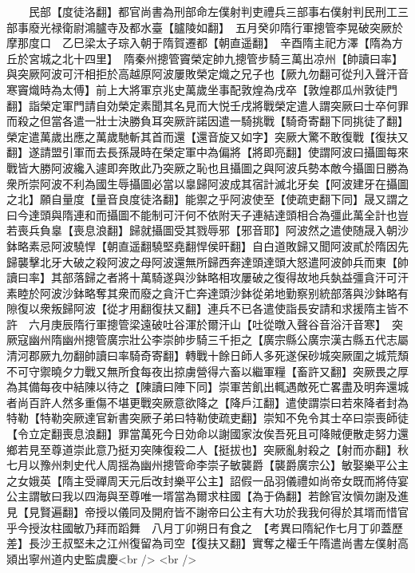 　　民部【度徒洛翻】都官尚書為刑部命左僕射判吏禮兵三部事右僕射判民刑工三部事廢光禄衛尉鴻臚寺及都水臺【臚陵如翻】　五月癸卯隋行軍摠管李晃破突厥於摩那度口　乙巳梁太子琮入朝于隋賀遷都【朝直遥翻】　辛酉隋主祀方澤【隋為方丘於宮城之北十四里】　隋秦州摠管竇榮定帥九摠管步騎三萬出凉州【帥讀曰率】與突厥阿波可汗相拒於高越原阿波屢敗榮定熾之兄子也【厥九勿翻可從刋入聲汗音寒竇熾時為太傅】前上大將軍京兆史萬歲坐事配敦煌為戌卒【敦煌郡瓜州敦徒門翻】詣榮定軍門請自効榮定素聞其名見而大悦壬戌將戰榮定遣人謂突厥曰士卒何罪而殺之但當各遣一壯士決勝負耳突厥許諾因遣一騎挑戰【騎奇寄翻下同挑徒了翻】榮定遣萬歲出應之萬歲馳斬其首而還【還音旋又如字】突厥大驚不敢復戰【復扶又翻】遂請盟引軍而去長孫晟時在榮定軍中為偏將【將即亮翻】使謂阿波曰攝圖每來戰皆大勝阿波纔入遽即奔敗此乃突厥之恥也且攝圖之與阿波兵勢本敵今攝圖日勝為衆所崇阿波不利為國生辱攝圖必當以辠歸阿波成其宿計滅北牙矣【阿波建牙在攝圖之北】願自量度【量音良度徒洛翻】能禦之乎阿波使至【使疏吏翻下同】晟又謂之曰今達頭與隋連和而攝圖不能制可汗何不依附天子連結達頭相合為彊此萬全計也豈若喪兵負辠【喪息浪翻】歸就攝圖受其戮辱邪【邪音耶】阿波然之遣使随晟入朝沙鉢略素忌阿波驍悍【朝直遥翻驍堅堯翻悍侯旰翻】自白道敗歸又聞阿波貳於隋因先歸襲擊北牙大破之殺阿波之母阿波還無所歸西奔達頭達頭大怒遣阿波帥兵而東【帥讀曰率】其部落歸之者將十萬騎遂與沙鉢略相攻屢破之復得故地兵埶益彊貪汗可汗素睦於阿波沙鉢略奪其衆而廢之貪汗亡奔達頭沙鉢從弟地勤察别統部落與沙鉢略有隙復以衆叛歸阿波【從才用翻復扶又翻】連兵不已各遣使詣長安請和求援隋主皆不許　六月庚辰隋行軍摠管梁遠破吐谷渾於爾汗山【吐從暾入聲谷音浴汗音寒】　突厥寇幽州隋幽州摠管廣宗壯公李崇帥步騎三千拒之【廣宗縣公廣宗漢古縣五代志屬清河郡厥九勿翻帥讀曰率騎奇寄翻】轉戰十餘日師人多死遂保砂城突厥圍之城荒頹不可守禦曉夕力戰又無所食每夜出掠虜營得六畜以繼軍糧【畜許又翻】突厥畏之厚為其備每夜中結陳以待之【陳讀曰陣下同】崇軍苦飢出輒遇敵死亡畧盡及明奔還城者尚百許人然多重傷不堪更戰突厥意欲降之【降戶江翻】遣使謂崇曰若來降者封為特勒【特勒突厥達官新書突厥子弟曰特勒使疏吏翻】崇知不免令其士卒曰崇喪師徒【令立定翻喪息浪翻】罪當萬死今日効命以謝國家汝俟吾死且可降賊便散走努力還鄉若見至尊道崇此意乃挺刃突陳復殺二人【挺拔也】突厥亂射殺之【射而亦翻】秋七月以豫州刺史代人周揺為幽州摠管命李崇子敏襲爵【襲爵廣宗公】敏娶樂平公主之女娥英【隋主受禪周天元后改封樂平公主】詔假一品羽儀禮如尚帝女既而將侍宴公主謂敏曰我以四海與至尊唯一壻當為爾求柱國【為于偽翻】若餘官汝愼勿謝及進見【見賢遍翻】帝授以儀同及開府皆不謝帝曰公主有大功於我我何得於其壻而惜官乎今授汝柱國敏乃拜而蹈舞　八月丁卯朔日有食之　【考異曰隋紀作七月丁卯蓋歷差】長沙王叔堅未之江州復留為司空【復扶又翻】實奪之權壬午隋遣尚書左僕射高熲出寧州道内史監虞慶<br />
<br />
